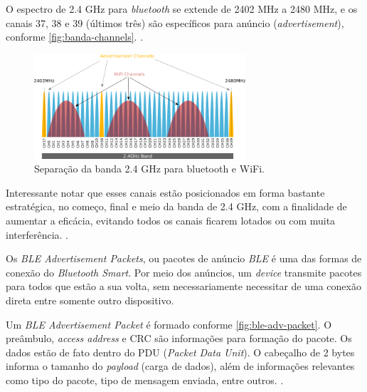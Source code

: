 O espectro de 2.4 GHz para \textit{bluetooth} se extende de 2402 MHz a 2480 MHz, e os canais 37, 38 e 39 (últimos três) são específicos para anúncio (\textit{advertisement}), conforme \autoref{fig:banda-channels}.  \cite{ble-packets}. 

\begin{figure}[htb]
	\caption{\label{fig:banda-channels}Separação da banda 2.4 GHz para bluetooth e WiFi.}
	\begin{center}
		\includegraphics[width=0.7\textwidth]{img/banda-2-4.png}
	\end{center}
\end{figure}

Interessante notar que esses canais estão posicionados em forma bastante estratégica, no começo, final e meio da banda de 2.4 GHz, com a finalidade de aumentar a eficácia, evitando todos os canais ficarem lotados ou com muita interferência. \cite{ble-packets}. 

Os \textit{BLE Advertisement Packets}, ou pacotes de anúncio \textit{BLE} é uma das formas de conexão do \textit{Bluetooth Smart}. Por meio dos anúncios, um \textit{device} transmite pacotes para todos que estão a sua volta, sem necessariamente necessitar de uma conexão direta entre somente outro dispositivo.

Um \textit{BLE Advertisement Packet} é formado conforme \autoref{fig:ble-adv-packet}. O preâmbulo, \textit{access address} e CRC são informações para formação do pacote. Os dados estão de fato dentro do PDU (\textit{Packet Data Unit}). O cabeçalho de 2 bytes informa o tamanho do \textit{payload} (carga de dados), além de informações relevantes como tipo do pacote, tipo de mensagem enviada, entre outros. \cite{ble-packets}.

